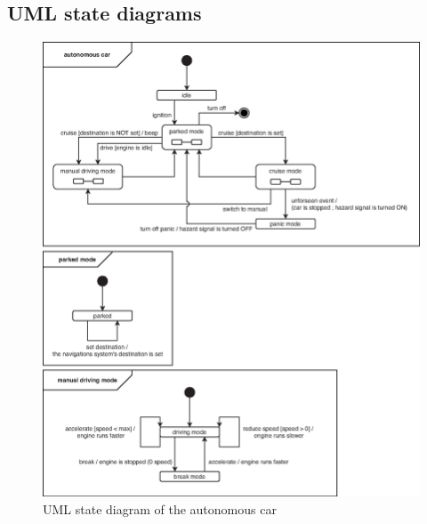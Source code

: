 \documentclass[12pt]{article}
\begin{document}
\begin{spacing}{1.5}
\newpage

\section{UML state diagrams}

\begin{figure}[h!]
	\centering
		\includegraphics[width=1\textwidth]{./figures/eps/EFSM.eps}
		  \caption{UML state diagram of the autonomous car}
  \label{fig:state-diagram}
\end{figure}
\begin{figure}[h!]
	\centering

\end{figure}
\end{spacing}
\end{document}
